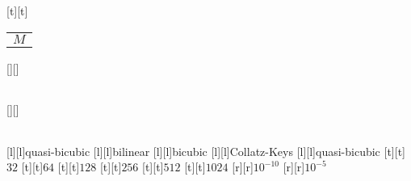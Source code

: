 %    
%
%
\begin{psfrags}%
\psfragscanon%
%
[t][t]{\color[rgb]{0,0,0}\setlength{\tabcolsep}{0pt}\begin{tabular}{c}$M$\end{tabular}}%
[][]{\color[rgb]{0,0,0}\setlength{\tabcolsep}{0pt}\begin{tabular}{c} \end{tabular}}%
[][]{\color[rgb]{0,0,0}\setlength{\tabcolsep}{0pt}\begin{tabular}{c} \end{tabular}}%
[l][l]{\color[rgb]{0,0,0}quasi-bicubic}%
[l][l]{\color[rgb]{0,0,0}bilinear}%
[l][l]{\color[rgb]{0,0,0}bicubic}%
[l][l]{\color[rgb]{0,0,0}Collatz-Keys}%
[l][l]{\color[rgb]{0,0,0}quasi-bicubic}%
%
[t][t]{$32$}%
[t][t]{$64$}%
[t][t]{$128$}%
[t][t]{$256$}%
[t][t]{$512$}%
[t][t]{$1024$}%
%
[r][r]{$10^{-10}$}%
[r][r]{$10^{-5}$}%
%
%
\end{psfrags}%
%
